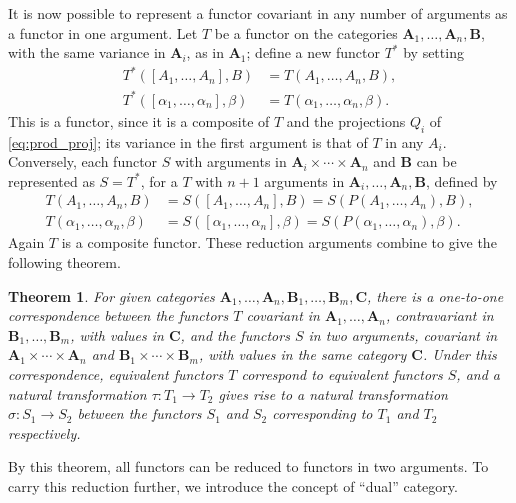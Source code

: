\documentclass[11pt,a4paper]{report}
\newtheorem{theorem}{Theorem}
\begin{document}
It is now possible to represent a functor covariant in any number of arguments as a functor in one argument.
Let $T$ be a functor on the categories $\mathbf{A}_1,\dotsc,\mathbf{A}_n,\mathbf{B}$, with the same variance
in $\mathbf{A}_i$, as in $\mathbf{A}_1$; define a new functor $T^\ast$ by setting
\begin{align*}
	T^\ast\left([A_1,\dotsc,A_n],B\right) &= T(A_1,\dotsc,A_n,B),\\
	T^\ast\left([\alpha_1,\dotsc,\alpha_n],\beta\right) &= T(\alpha_1,\dotsc,\alpha_n,\beta).
\end{align*}
This is a functor, since it is a composite of $T$ and the projections $Q_i$ of \cref{eq:prod_proj};
its variance in the first argument is that of $T$ in any $A_i$. Conversely, each functor $S$ with arguments in
$\mathbf{A}_i\times\dotsm\times\mathbf{A}_n$ and $\mathbf{B}$ can be represented as $S=T^\ast$, for a $T$ with
$n+1$ arguments in $\mathbf{A}_i,\dotsc,\mathbf{A}_n,\mathbf{B}$, defined by
\begin{align*}
	T(A_1,\dotsc,A_n,B) &=   S([A_1,\dotsc,A_n],B) = S(P(A_1,\dotsc,A_n),B),\\
	T(\alpha_1,\dotsc,\alpha_n,\beta) &=   S([\alpha_1,\dotsc,\alpha_n],\beta) = S(P(\alpha_1,\dotsc,\alpha_n),\beta).
\end{align*}
Again $T$ is a composite functor. These reduction arguments combine to give the following theorem.
\begin{theorem}
	For given categories $\mathbf{A}_1,\dotsc,\mathbf{A}_n,\mathbf{B}_1,\dotsc,\mathbf{B}_m,\mathbf{C}$,
	there is a one\hyp{}to\hyp{}one correspondence between the functors $T$ covariant in $\mathbf{A}_1,\dotsc,\mathbf{A}_n$,
	contravariant in $\mathbf{B}_1,\dotsc,\mathbf{B}_m$, with values in $\mathbf{C}$, and the functors $S$ in two arguments,
	covariant in $\mathbf{A}_1\times\dotsm\times\mathbf{A}_n$ and $\mathbf{B}_1\times\dotsm\times\mathbf{B}_m$, with values
	in the same category $\mathbf{C}$. Under this correspondence, equivalent functors $T$ correspond to equivalent functors
	$S$, and a natural transformation $\tau:T_1\rightarrow T_2$ gives rise to a natural transformation $\sigma:S_1\rightarrow S_2$
	between the functors $S_1$ and $S_2$ corresponding to $T_1$ and $T_2$ respectively.
\end{theorem}

By this theorem, all functors can be reduced to functors in two arguments. To carry this reduction further, we introduce the concept
of ``dual'' category.
\end{document}
